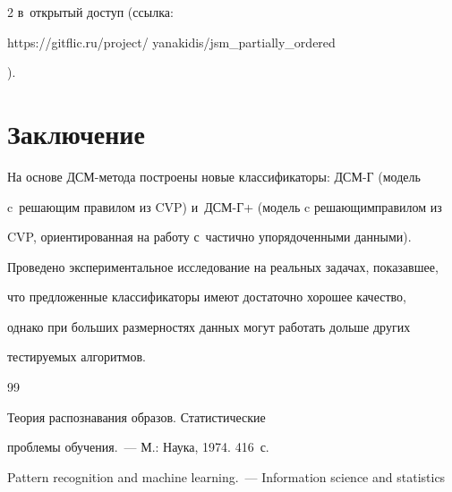\begin{multicols}{2}
в~открытый доступ (ссылка: {\sf 


https://gitflic.ru/project/ yanakidis/jsm\_partially\_ordered}).





\vspace*{-6pt}





\section{Заключение }





\vspace*{-3pt}





  На основе ДСМ-метода построены новые классификаторы: ДСМ-Г (модель 


c~решающим правилом из CVP) и~ДСМ-Г+ (модель c решающим\linebreak правилом из 


CVP, ориентированная на работу с~час\-тич\-но упорядоченными данными). 


Проведено эксперимен\-таль\-ное исследование на реальных задачах, показавшее, 


что предложенные классификаторы имеют достаточно хорошее качество, 


однако при больших размерностях данных могут работать дольше других 


тестируемых алгоритмов.


   


{\small\frenchspacing


 { %




 \begin{thebibliography}{99} 




 Теория распознавания образов. Статистические 


проблемы обучения.~--- М.: Наука, 1974. 416~с.




 Pattern recognition and machine learning.~--- Information science and statistics 



\end{thebibliography}}}
\end{multicols}
